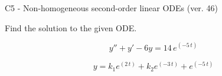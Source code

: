 \begin{exercise}
  \begin{exerciseTitle}C5 - Non-homogeneous second-order linear ODEs (ver. 46)\end{exerciseTitle}
  \begin{exerciseStatement}
    
Find the solution to the given ODE.

    
\[y''+y'-6y = 14 \, e^{\left(-5 \, t\right)}\]

  \end{exerciseStatement}
  \begin{exerciseAnswer}
    
\[y= k_{1} e^{\left(2 \, t\right)} + k_{2} e^{\left(-3 \, t\right)} + e^{\left(-5 \, t\right)}\]

  \end{exerciseAnswer}
\end{exercise}